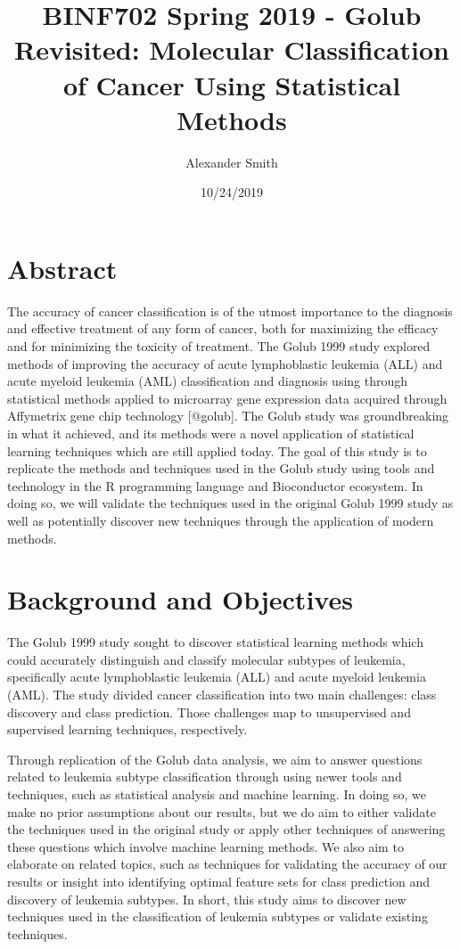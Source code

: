 \documentclass[]{article}
\title{BINF702 Spring 2019 - Golub Revisited: Molecular Classification of
Cancer Using Statistical Methods}
\author{Alexander Smith}
\date{10/24/2019}
\begin{document}
\maketitle

\section{Abstract}\label{abstract}

The accuracy of cancer classification is of the utmost importance to the
diagnosis and effective treatment of any form of cancer, both for
maximizing the efficacy and for minimizing the toxicity of treatment.
The Golub 1999 study explored methods of improving the accuracy of acute
lymphoblastic leukemia (ALL) and acute myeloid leukemia (AML)
classification and diagnosis using through statistical methods applied
to microarray gene expression data acquired through Affymetrix gene chip
technology {[}@golub{]}. The Golub study was groundbreaking in what it
achieved, and its methods were a novel application of statistical
learning techniques which are still applied today. The goal of this
study is to replicate the methods and techniques used in the Golub study
using tools and technology in the R programming language and
Bioconductor ecosystem. In doing so, we will validate the techniques
used in the original Golub 1999 study as well as potentially discover
new techniques through the application of modern methods.

\section{Background and Objectives}\label{background-and-objectives}

The Golub 1999 study sought to discover statistical learning methods
which could accurately distinguish and classify molecular subtypes of
leukemia, specifically acute lymphoblastic leukemia (ALL) and acute
myeloid leukemia (AML). The study divided cancer classification into two
main challenges: class discovery and class prediction. Those challenges
map to unsupervised and supervised learning techniques, respectively.

Through replication of the Golub data analysis, we aim to answer
questions related to leukemia subtype classification through using newer
tools and techniques, such as statistical analysis and machine learning.
In doing so, we make no prior assumptions about our results, but we do
aim to either validate the techniques used in the original study or
apply other techniques of answering these questions which involve
machine learning methods. We also aim to elaborate on related topics,
such as techniques for validating the accuracy of our results or insight
into identifying optimal feature sets for class prediction and discovery
of leukemia subtypes. In short, this study aims to discover new
techniques used in the classification of leukemia subtypes or validate
existing techniques.
\end{document}
